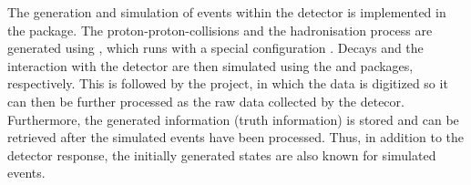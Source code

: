 The generation and simulation of events within the \lhcb detector is implemented in the \gauss package.
The proton-proton-collisions and the hadronisation process are generated using \pythia \cite{pythia6, pythia8}, which runs with a special \lhcb configuration \cite{LHCb-PROC-2010-056}.
Decays and the interaction with the detector are then simulated using the \evtgen \cite{evtgen} and \geant \cite{geant1, geant2} packages, respectively.
This is followed by the \boole project, in which the data is digitized so it can then be further processed as the raw data collected by the detecor.
Furthermore, the generated information (truth information) is stored and can be retrieved after the simulated events have been processed.
Thus, in addition to the detector response, the initially generated states are also known for simulated events.
